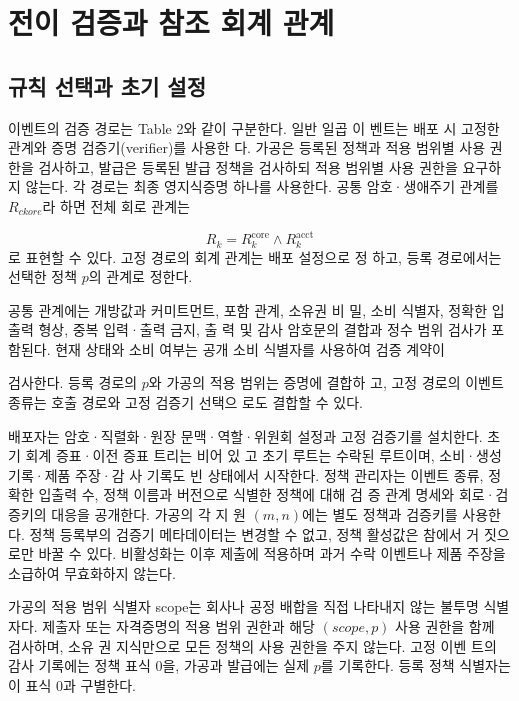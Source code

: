 \section{전이 검증과 참조 회계 관계}

\subsection{규칙 선택과 초기 설정}
이벤트의 검증 경로는 Table 2와 같이 구분한다. 일반 일곱 이
벤트는 배포 시 고정한 관계와 증명 검증기(verifier)를 사용한
다. 가공은 등록된 정책과 적용 범위별 사용 권한을 검사하고,
발급은 등록된 발급 정책을 검사하되 적용 범위별 사용 권한을
요구하지 않는다. 각 경로는 최종 영지식증명 하나를 사용한다.
공통 암호·생애주기 관계를 \(R_{ckore}\)라 하면 전체 회로 관계는

\begin{equation}
    R_k=R_k^{\mathrm{core}}\land R_k^{\mathrm{acct}}\tag{12}
\end{equation}
로 표현할 수 있다. 고정 경로의 회계 관계는 배포 설정으로 정
하고, 등록 경로에서는 선택한 정책 \(p\)의 관계로 정한다.

공통 관계에는 개방값과 커미트먼트, 포함 관계, 소유권 비
밀, 소비 식별자, 정확한 입출력 형상, 중복 입력·출력 금지, 출
력 및 감사 암호문의 결합과 정수 범위 검사가 포함된다. 현재
상태와 소비 여부는 공개 소비 식별자를 사용하여 검증 계약이

검사한다. 등록 경로의 \(p\)와 가공의 적용 범위는 증명에 결합하
고, 고정 경로의 이벤트 종류는 호출 경로와 고정 검증기 선택으
로도 결합할 수 있다.

배포자는 암호·직렬화·원장 문맥·역할·위원회 설정과 고정
검증기를 설치한다. 초기 회계 증표·이전 증표 트리는 비어 있
고 초기 루트는 수락된 루트이며, 소비·생성 기록·제품 주장·감
사 기록도 빈 상태에서 시작한다. 정책 관리자는 이벤트 종류,
정확한 입출력 수, 정책 이름과 버전으로 식별한 정책에 대해 검
증 관계 명세와 회로·검증키의 대응을 공개한다. 가공의 각 지
원 \((m,n)\)에는 별도 정책과 검증키를 사용한다. 정책 등록부의
검증기 메타데이터는 변경할 수 없고, 정책 활성값은 참에서 거
짓으로만 바꿀 수 있다. 비활성화는 이후 제출에 적용하며 과거
수락 이벤트나 제품 주장을 소급하여 무효화하지 않는다.

가공의 적용 범위 식별자 scope는 회사나 공정 배합을 직접
나타내지 않는 불투명 식별자다. 제출자 또는 자격증명의 적용
범위 권한과 해당 \((scope,p)\) 사용 권한을 함께 검사하며, 소유
권 지식만으로 모든 정책의 사용 권한을 주지 않는다. 고정 이벤
트의 감사 기록에는 정책 표식 0을, 가공과 발급에는 실제 \(p\)를
기록한다. 등록 정책 식별자는 이 표식 0과 구별한다.

